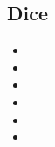 \subsection{Dice}

\begin{multicols}{2}
\begin{itemize}
	\item \glyphdemo{\diceOne}
	\item \glyphdemo{\diceTwo}
	\item \glyphdemo{\diceThree}
	\item \glyphdemo{\diceFour}
	\item \glyphdemo{\diceFive}
	\item \glyphdemo{\diceSix}
\end{itemize}
\end{multicols}

\newpage
